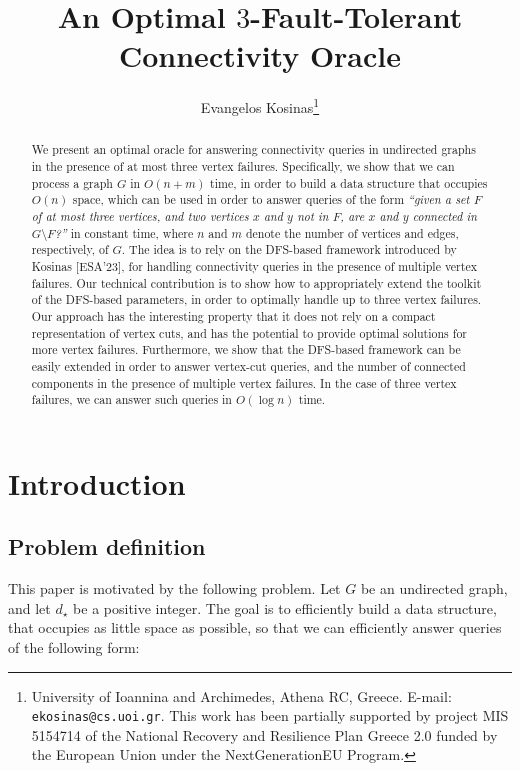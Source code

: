 \documentclass[11pt,a4paper]{article}
\author{Evangelos Kosinas\thanks{University of Ioannina and Archimedes, Athena RC, Greece. E-mail: \texttt{ekosinas@cs.uoi.gr}. This work has been partially supported by project MIS 5154714 of the National Recovery and Resilience Plan Greece 2.0 funded by the European Union under the NextGenerationEU Program.}}
\begin{document}
\title{An Optimal $3$-Fault-Tolerant Connectivity Oracle}


\maketitle

\begin{abstract}
We present an optimal oracle for answering connectivity queries in undirected graphs in the presence of at most three vertex failures. Specifically, we show that we can process a graph $G$ in $O(n+m)$ time, in order to build a data structure that occupies $O(n)$ space, which can be used in order to answer queries of the form \emph{``given a set $F$ of at most three vertices, and two vertices $x$ and $y$ not in $F$, are $x$ and $y$ connected in $G\setminus F$?''} in constant time, where $n$ and $m$ denote the number of vertices and edges, respectively, of $G$. The idea is to rely on the DFS-based framework introduced by Kosinas [ESA'23], for handling connectivity queries in the presence of multiple vertex failures. Our technical contribution is to show how to appropriately extend the toolkit of the DFS-based parameters, in order to optimally handle up to three vertex failures. Our approach has the interesting property that it does not rely on a compact representation of vertex cuts, and has the potential to provide optimal solutions for more vertex failures. Furthermore, we show that the DFS-based framework can be easily extended in order to answer vertex-cut queries, and the number of connected components in the presence of multiple vertex failures. In the case of three vertex failures, we can answer such queries in $O(\log n)$ time.
\end{abstract}


\clearpage

\small

\tableofcontents

\clearpage

\normalsize

\section{Introduction}

\subsection{Problem definition}
This paper is motivated by the following problem. Let $G$ be an undirected graph, and let $d_{\star}$ be a positive integer. The goal is to efficiently build a data structure, that occupies as little space as possible, so that we can efficiently answer queries of the following form:\\
\end{document}
